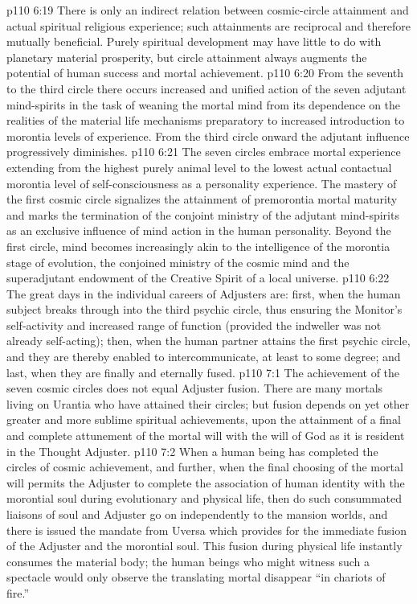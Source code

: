 \vs p110 6:19 There is only an indirect relation between cosmic\hyp{}circle attainment and actual spiritual religious experience; such attainments are reciprocal and therefore mutually beneficial. Purely spiritual development may have little to do with planetary material prosperity, but circle attainment always augments the potential of human success and mortal achievement.
\vs p110 6:20 From the seventh to the third circle there occurs increased and unified action of the seven adjutant mind\hyp{}spirits in the task of weaning the mortal mind from its dependence on the realities of the material life mechanisms preparatory to increased introduction to morontia levels of experience. From the third circle onward the adjutant influence progressively diminishes.
\vs p110 6:21 \pc The seven circles embrace mortal experience extending from the highest purely animal level to the lowest actual contactual morontia level of self\hyp{}consciousness as a personality experience. The mastery of the first cosmic circle signalizes the attainment of premorontia mortal maturity and marks the termination of the conjoint ministry of the adjutant mind\hyp{}spirits as an exclusive influence of mind action in the human personality. Beyond the first circle, mind becomes increasingly akin to the intelligence of the morontia stage of evolution, the conjoined ministry of the cosmic mind and the superadjutant endowment of the Creative Spirit of a local universe.
\vs p110 6:22 The great days in the individual careers of Adjusters are: first, when the human subject breaks through into the third psychic circle, thus ensuring the Monitor’s self\hyp{}activity and increased range of function (provided the indweller was not already self\hyp{}acting); then, when the human partner attains the first psychic circle, and they are thereby enabled to intercommunicate, at least to some degree; and last, when they are finally and eternally fused.
\vs p110 7:1 The achievement of the seven cosmic circles does not equal Adjuster fusion. There are many mortals living on Urantia who have attained their circles; but fusion depends on yet other greater and more sublime spiritual achievements, upon the attainment of a final and complete attunement of the mortal will with the will of God as it is resident in the Thought Adjuster.
\vs p110 7:2 When a human being has completed the circles of cosmic achievement, and further, when the final choosing of the mortal will permits the Adjuster to complete the association of human identity with the morontial soul during evolutionary and physical life, then do such consummated liaisons of soul and Adjuster go on independently to the mansion worlds, and there is issued the mandate from Uversa which provides for the immediate fusion of the Adjuster and the morontial soul. This fusion during physical life instantly consumes the material body; the human beings who might witness such a spectacle would only observe the translating mortal disappear “in chariots of fire.”
